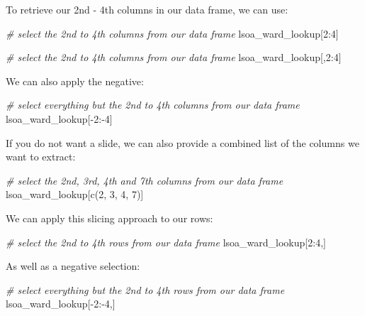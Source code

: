 \documentclass[
]{book}
\newenvironment{Shaded}{\begin{snugshade}}{\end{snugshade}}
\newcommand{\CommentTok}[1]{\textcolor[rgb]{0.56,0.35,0.01}{\textit{#1}}}
\newcommand{\DecValTok}[1]{\textcolor[rgb]{0.00,0.00,0.81}{#1}}
\newcommand{\FunctionTok}[1]{\textcolor[rgb]{0.00,0.00,0.00}{#1}}
\newcommand{\NormalTok}[1]{#1}
\newcommand{\SpecialCharTok}[1]{\textcolor[rgb]{0.00,0.00,0.00}{#1}}
\begin{document}
To retrieve our 2nd - 4th columns in our data frame, we can use:

\begin{Shaded}
\begin{Highlighting}[]
\CommentTok{\# select the 2nd to 4th columns from our data frame}
\NormalTok{lsoa\_ward\_lookup[}\DecValTok{2}\SpecialCharTok{:}\DecValTok{4}\NormalTok{]}

\CommentTok{\# select the 2nd to 4th columns from our data frame}
\NormalTok{ lsoa\_ward\_lookup[,}\DecValTok{2}\SpecialCharTok{:}\DecValTok{4}\NormalTok{]}
\end{Highlighting}
\end{Shaded}

We can also apply the negative:

\begin{Shaded}
\begin{Highlighting}[]
\CommentTok{\# select everything but the 2nd to 4th columns from our data frame}
\NormalTok{lsoa\_ward\_lookup[}\SpecialCharTok{{-}}\DecValTok{2}\SpecialCharTok{:{-}}\DecValTok{4}\NormalTok{]}
\end{Highlighting}
\end{Shaded}

If you do not want a slide, we can also provide a combined list of the columns we want to extract:

\begin{Shaded}
\begin{Highlighting}[]
\CommentTok{\# select the 2nd, 3rd, 4th and 7th columns from our data frame}
\NormalTok{lsoa\_ward\_lookup[}\FunctionTok{c}\NormalTok{(}\DecValTok{2}\NormalTok{, }\DecValTok{3}\NormalTok{, }\DecValTok{4}\NormalTok{, }\DecValTok{7}\NormalTok{)]}
\end{Highlighting}
\end{Shaded}

We can apply this slicing approach to our rows:

\begin{Shaded}
\begin{Highlighting}[]
\CommentTok{\# select the 2nd to 4th rows from our data frame}
\NormalTok{lsoa\_ward\_lookup[}\DecValTok{2}\SpecialCharTok{:}\DecValTok{4}\NormalTok{,]}
\end{Highlighting}
\end{Shaded}

As well as a negative selection:

\begin{Shaded}
\begin{Highlighting}[]
\CommentTok{\# select everything but the 2nd to 4th rows from our data frame}
\NormalTok{lsoa\_ward\_lookup[}\SpecialCharTok{{-}}\DecValTok{2}\SpecialCharTok{:{-}}\DecValTok{4}\NormalTok{,]}
\end{Highlighting}
\end{Shaded}
\end{document}
